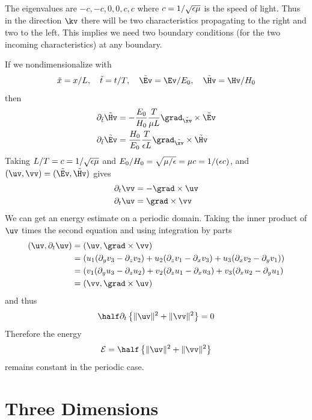 \documentclass[10pt]{article}
\begin{document}
The eigenvalues are $-c,-c,0,0,c,c$ where $c=1/\sqrt{\epsilon\mu}$ is the speed of light.
Thus in the direction $\kv$ there will be two characteristics propagating to the 
right and two to the left. This implies we need two boundary conditions (for the two
incoming characteristics) at any boundary.

If we nondimensionalize with
\[
   \tilde{x}=x/L, \quad \tilde{t}=t/T, \quad \tilde{\Ev}=\Ev/E_0, \quad \tilde{\Hv}=\Hv/H_0
\]
then
\begin{align*}
  \partial_{\tilde{t}} \tilde{\Hv} &= - {E_0\over H_0} {T\over \mu L} \grad_{\tilde{\xv}} \times \tilde{\Ev} \\
  \partial_{\tilde{t}} \tilde{\Ev} &=   {H_0\over E_0} {T\over \eps L} \grad_{\tilde{\xv}} \times \tilde{\Hv} 
\end{align*}
Taking $L/T=c=1/\sqrt{\epsilon \mu}$ and $E_0/H_0=\sqrt{\mu/\epsilon}=\mu c = 1/(\epsilon c)$, 
and $(\uv,\vv)=(\tilde{\Ev},\tilde{\Hv})$
gives
\begin{align*}
  \partial_t \vv &= - \grad\times\uv \\
  \partial_t \uv &=  \grad\times\vv
\end{align*}
We can get an energy estimate on a periodic domain. Taking the inner product of $\uv$ times the second
equation and using integration by parts
\begin{align*}
  (\uv,\partial_t \uv) &= (\uv,\grad\times\vv) \\
                       &= ( u_1(\partial_y v_3 - \partial_z v_2) + u_2(\partial_z v_1 - \partial_x v_3)
                            + u_3(\partial_x v_2 - \partial_y v_1) ) \\
                       &= ( v_1( \partial_y u_3 - \partial_z u_2 ) + v_2(\partial_z u_1- \partial_x u_3)
                          + v_3(\partial_x u_2- \partial_y u_1) \\
                       &= ( \vv, \grad\times\uv )
\end{align*}
and thus
\[
   \half \partial_t\left\{ \| \uv \|^2 + \| \vv \|^2 \right\} = 0
\]
Therefore the energy 
\[
{\cal E} = \half\left\{ \| \uv \|^2 + \| \vv\|^2 \right\}
\]
remains constant in the periodic case.

\clearpage
\section{Three Dimensions}
\end{document}
